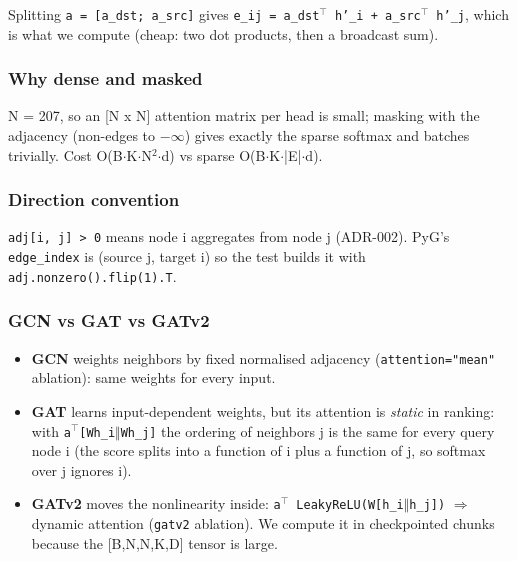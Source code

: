 \documentclass[10pt,a4paper]{article}
\begin{document}
Splitting \texttt{a = [a\_\allowbreak{}dst; a\_\allowbreak{}src]} gives \texttt{e\_\allowbreak{}ij = a\_\allowbreak{}dst\ensuremath{^{\top}} h'\_\allowbreak{}i + a\_\allowbreak{}src\ensuremath{^{\top}} h'\_\allowbreak{}j}, which is what we compute (cheap: two dot products, then a broadcast sum).

\subsubsection*{Why dense and masked}
N = 207, so an [N x N] attention matrix per head is small; masking with the adjacency (non-edges to \ensuremath{-}\ensuremath{\infty}) gives exactly the sparse softmax and batches trivially. Cost O(B\ensuremath{\cdot}K\ensuremath{\cdot}N\ensuremath{^{2}}\ensuremath{\cdot}d) vs sparse O(B\ensuremath{\cdot}K\ensuremath{\cdot}|E|\ensuremath{\cdot}d).

\subsubsection*{Direction convention}
\texttt{adj[i, j] > 0} means node i aggregates from node j (ADR-002). PyG's \texttt{edge\_\allowbreak{}index} is (source j, target i) so the test builds it with \texttt{adj.nonzero().flip(1).T}.

\subsubsection*{GCN vs GAT vs GATv2}
\begin{itemize}[nosep,leftmargin=*]
\item \textbf{GCN} weights neighbors by fixed normalised adjacency (\texttt{attention="mean"} ablation): same weights for every input.
\item \textbf{GAT} learns input-dependent weights, but its attention is \emph{static} in ranking: with \texttt{a\ensuremath{^{\top}}[Wh\_\allowbreak{}i\ensuremath{\Vert}Wh\_\allowbreak{}j]} the ordering of neighbors j is the same for every query node i (the score splits into a function of i plus a function of j, so softmax over j ignores i).
\item \textbf{GATv2} moves the nonlinearity inside: \texttt{a\ensuremath{^{\top}} LeakyReLU(W[h\_\allowbreak{}i\ensuremath{\Vert}h\_\allowbreak{}j])} \ensuremath{\Rightarrow} dynamic attention (\texttt{gatv2} ablation). We compute it in checkpointed chunks because the [B,N,N,K,D] tensor is large.
\end{itemize}
\end{document}
